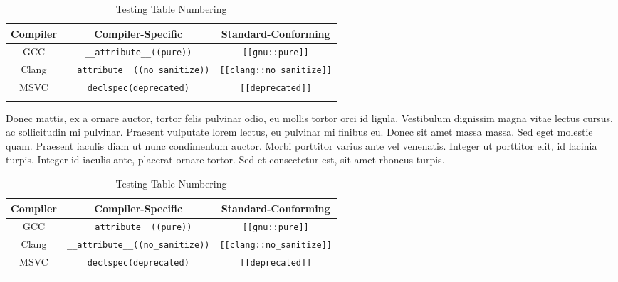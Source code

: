 \begin{table}[h!] 
\begin{center}
\begin{threeparttable}
\caption{Testing Table Numbering}\label{test-table1}\vspace{1.5ex} 
{\small \begin{tabular}{c|c|c}\thickhline 
\rowcolor[gray]{.9}   {\sffamily\bfseries Compiler} & {\sffamily\bfseries Compiler-Specific} &
{\sffamily\bfseries Standard-Conforming} \\ \hline 
GCC &\lstinline!__attribute__((pure))! & \lstinline![[gnu::pure]]! \\ \hline
Clang & \lstinline!__attribute__((no_sanitize))! &\lstinline![[clang::no_sanitize]]! \\ \hline 
MSVC & \lstinline!declspec(deprecated)! & \lstinline![[deprecated]]! \\ \thickhline
\end{tabular}
}
\end{threeparttable} 
\end{center}
\end{table}

Donec mattis, ex a ornare auctor, tortor felis pulvinar odio, eu mollis tortor orci id ligula. Vestibulum dignissim magna vitae lectus cursus, ac sollicitudin mi pulvinar. Praesent vulputate lorem lectus, eu pulvinar mi finibus eu. Donec sit amet massa massa. Sed eget molestie quam. Praesent iaculis diam ut nunc condimentum auctor. Morbi porttitor varius ante vel venenatis. Integer ut porttitor elit, id lacinia turpis. Integer id iaculis ante, placerat ornare tortor. Sed et consectetur est, sit amet rhoncus turpis.

\begin{table}[h!] 
\begin{center}
\begin{threeparttable}
\caption{Testing Table Numbering}\label{test-table1}\vspace{1.5ex} 
{\small \begin{tabular}{c|c|c}\thickhline 
\rowcolor[gray]{.9}   {\sffamily\bfseries Compiler} & {\sffamily\bfseries Compiler-Specific} &
{\sffamily\bfseries Standard-Conforming} \\ \hline 
GCC &\lstinline!__attribute__((pure))! & \lstinline![[gnu::pure]]! \\ \hline
Clang & \lstinline!__attribute__((no_sanitize))! &\lstinline![[clang::no_sanitize]]! \\ \hline 
MSVC & \lstinline!declspec(deprecated)! & \lstinline![[deprecated]]! \\ \thickhline
\end{tabular}
}
\end{threeparttable} 
\end{center}
\end{table}

